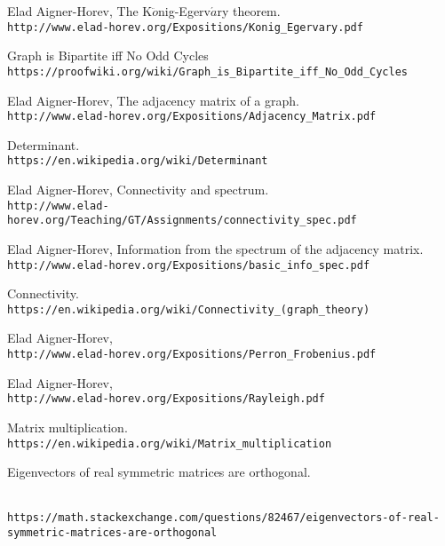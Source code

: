 \documentclass[a4paper, 11pt, oneside]{article}
\begin{document}
\begin{thebibliography}{9} 
Elad Aigner-Horev,
The K$\ddot{o}$nig-Egerv$\acute{a}$ry theorem.
\\\texttt{http://www.elad-horev.org/Expositions/Konig\_Egervary.pdf}

Graph is Bipartite iff No Odd Cycles
\\\texttt{https://proofwiki.org/wiki/Graph\_is\_Bipartite\_iff\_No\_Odd\_Cycles}

Elad Aigner-Horev,
The adjacency matrix of a graph.
\\\texttt{http://www.elad-horev.org/Expositions/Adjacency\_Matrix.pdf}

Determinant.
\\\texttt{https://en.wikipedia.org/wiki/Determinant}

Elad Aigner-Horev,
Connectivity and spectrum.
\\\texttt{http://www.elad-horev.org/Teaching/GT/Assignments/connectivity\_spec.pdf}

Elad Aigner-Horev,
Information from the spectrum of the adjacency matrix.
\\\texttt{http://www.elad-horev.org/Expositions/basic\_info\_spec.pdf}

Connectivity.
\\\texttt{https://en.wikipedia.org/wiki/Connectivity\_(graph\_theory)}

Elad Aigner-Horev,
\\\texttt{http://www.elad-horev.org/Expositions/Perron\_Frobenius.pdf}

Elad Aigner-Horev,
\\\texttt{http://www.elad-horev.org/Expositions/Rayleigh.pdf}

Matrix multiplication.
\\\texttt{https://en.wikipedia.org/wiki/Matrix\_multiplication}

Eigenvectors of real symmetric matrices are orthogonal.
\begin{scriptsize}
\\\texttt{https://math.stackexchange.com/questions/82467/eigenvectors-of-real-symmetric-matrices-are-orthogonal}
\end{scriptsize}
\end{thebibliography}
\end{document}
